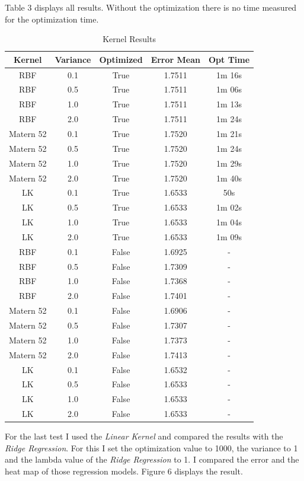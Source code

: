 \documentclass[10pt, a4paper, twocolumn]{article} %
\begin{document}
Table 3 displays all results. Without the optimization there is no time measured for the optimization time. 
\begin{table}[htbp]
    \label{tab:kernelSettings}
	\caption{Kernel Results}
	\centering
	\begin{tabular}{ccccc}
		\cmidrule(r){1-5}
		Kernel & Variance & Optimized & Error Mean & Opt Time \\
		\midrule
		RBF & 0.1 & True & 1.7511 & 1m 16s\\	
		RBF & 0.5 & True & 1.7511 & 1m 06s\\					
		RBF & 1.0 & True & 1.7511 & 1m 13s\\
		RBF & 2.0 & True & 1.7511 & 1m 24s\\
		Matern 52 & 0.1 & True & 1.7520 & 1m 21s\\	
		Matern 52 & 0.5 & True & 1.7520 & 1m 24s\\					
		Matern 52 & 1.0 & True & 1.7520 & 1m 29s\\
		Matern 52 & 2.0 & True & 1.7520 & 1m 40s\\
		LK & 0.1 & True & 1.6533 & 50s\\	
		LK & 0.5 & True & 1.6533 & 1m 02s\\					
		LK & 1.0 & True & 1.6533 & 1m 04s\\
		LK & 2.0 & True & 1.6533 & 1m 09s\\
		RBF & 0.1 & False & 1.6925 & -\\	
		RBF & 0.5 & False & 1.7309 & -\\					
		RBF & 1.0 & False & 1.7368 & -\\
		RBF & 2.0 & False & 1.7401 & -\\
		Matern 52 & 0.1 & False & 1.6906 & -\\	
		Matern 52 & 0.5 & False & 1.7307 & -\\					
		Matern 52 & 1.0 & False & 1.7373 & -\\
		Matern 52 & 2.0 & False & 1.7413 & -\\
		LK & 0.1 & False & 1.6532 & -\\	
		LK & 0.5 & False & 1.6533 & -\\					
		LK & 1.0 & False & 1.6533 & -\\
		LK & 2.0 & False & 1.6533 & -\\
		\bottomrule
	\end{tabular}
\end{table}
For the last test I used the \textit{Linear Kernel} and compared the results with the \textit{Ridge Regression}. 
For this I set the optimization value to 1000, the variance to 1 and the lambda value of the \textit{Ridge Regression} to 1. I compared the error and the heat map of those regression models. Figure 6 displays the result. 
\end{document}
